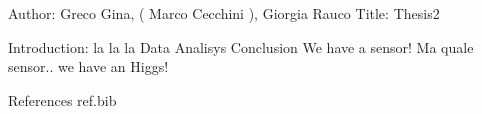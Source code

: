 Author: Greco Gina, ( Marco Cecchini ), Giorgia Rauco
Title: Thesis2

Introduction: la la la
Data
Analisys
Conclusion We have a sensor! Ma quale sensor.. we have an Higgs!


References
ref.bib
